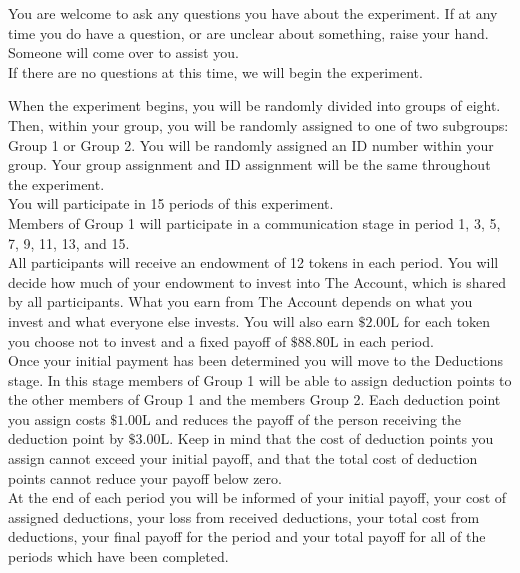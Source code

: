 \documentclass[12pt]{article}
\begin{document}
You are welcome to ask any questions you have about the experiment.  If at any time you do have a question, or are unclear about something, raise your hand. Someone will come over to assist you.\\

If there are no questions at this time, we will begin the experiment.\\ 
\fi


When the experiment begins, you will be randomly divided into groups of eight. Then, within your group, you will be randomly assigned to one of two subgroups: Group 1 or Group 2. You will be randomly assigned an ID number within your group. Your group assignment and ID assignment will be the same throughout the experiment.\\

You will participate in 15 periods of this experiment.\\

Members of Group 1 will participate in a communication stage in period 1, 3, 5, 7, 9, 11, 13, and 15.\\

All participants will receive an endowment of 12 tokens in each period. You will decide how much of your endowment to invest into The Account, which is shared by all participants. What you earn from The Account depends on what you invest and what everyone else invests. You will also earn $\$2.00\text{L}$ for each 
token you choose not to invest and a fixed payoff of $\$88.80\text{L}$ in each period.\\

Once your initial payment has been determined you will move to the Deductions stage. In this stage members of Group 1 will be able to assign deduction points to the other members of Group 1 and the members Group 2. Each deduction point you assign costs $\$1.00\text{L}$ and reduces the payoff of the person receiving the deduction point by $\$3.00\text{L}$. Keep in mind that the cost of deduction points you assign cannot exceed your initial payoff, and that the total cost of deduction points cannot reduce your payoff below zero.\\

At the end of each period you will be informed of your initial payoff, your cost of assigned deductions, your loss from received deductions, your total cost from deductions, your final payoff for the period and your total payoff for all of the periods which have been completed.
\end{document}
